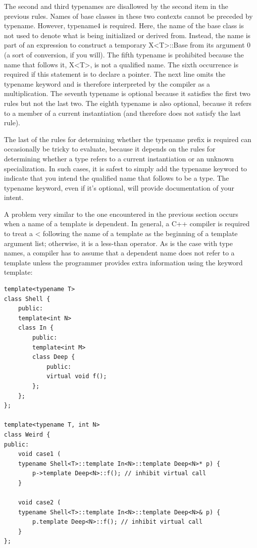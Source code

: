 The second and third typenames are disallowed by the second item in the previous rules. Names of base classes in these two contexts cannot be preceded by typename. However, typename4 is required. Here, the name of the base class is not used to denote what is being initialized or derived from. Instead, the name is part of an expression to construct a temporary X<T>::Base from its argument 0 (a sort of conversion, if you will). The fifth typename is prohibited because the name that follows it, X<T>, is not a qualified name. The sixth occurrence is required if this statement is to declare a pointer. The next line omits the typename keyword and is therefore interpreted by the compiler as a multiplication. The seventh typename is optional because it satisfies the first two rules but not the last two. The eighth typename is also optional, because it refers to a member of a current instantiation (and therefore does not satisfy the last rule).

The last of the rules for determining whether the typename prefix is required can occasionally be tricky to evaluate, because it depends on the rules for determining whether a type refers to a current instantiation or an unknown specialization. In such cases, it is safest to simply add the typename keyword to indicate that you intend the qualified name that follows to be a type. The typename keyword, even if it’s optional, will provide documentation of your intent.


A problem very similar to the one encountered in the previous section occurs when a name of a template is dependent. In general, a C++ compiler is required to treat a < following the name of a template as the beginning of a template argument list; otherwise, it is a less-than operator. As is the case with type names, a compiler has to assume that a dependent name does not refer to a template unless the programmer provides extra information using the keyword template:

\begin{lstlisting}[style=styleCXX]
template<typename T>
class Shell {
	public:
	template<int N>
	class In {
		public:
		template<int M>
		class Deep {
			public:
			virtual void f();
		};
	};
};

template<typename T, int N>
class Weird {
public:
	void case1 (
	typename Shell<T>::template In<N>::template Deep<N>* p) {
		p->template Deep<N>::f(); // inhibit virtual call
	}

	void case2 (
	typename Shell<T>::template In<N>::template Deep<N>& p) {
		p.template Deep<N>::f(); // inhibit virtual call
	}
};
\end{lstlisting}

